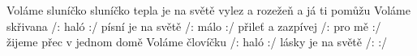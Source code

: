 \begin{TEXT}{Voláme sluníčko}
\SLOKA {} sluníčko   \NL
tepla je na světě   \NL
vylez a rozežeň   \NL
a já ti pomůžu    
\SLOKA Voláme skřivana /: haló :/ \NL
písní je na světě /: málo :/ \NL
přileť a zazpívej /: pro mě :/ \NL
žijeme přec v jednom domě 
\SLOKA Voláme človíčku /: haló :/ \NL
lásky je na světě /:    :/ 
\end{TEXT}

